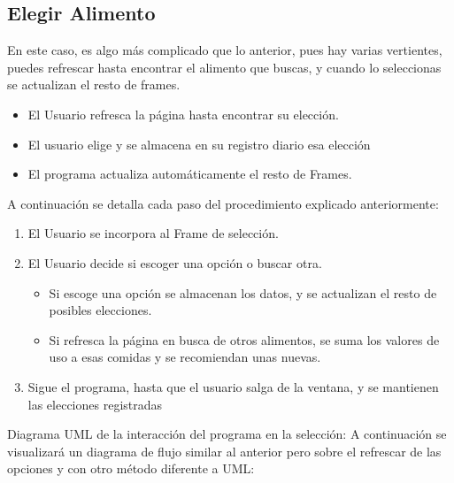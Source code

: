 \subsection{Elegir Alimento}
En este caso, es algo más complicado que lo anterior, pues hay varias vertientes, puedes refrescar hasta encontrar el alimento que buscas, y cuando lo seleccionas se actualizan el resto de frames.
\begin{itemize}
\item El Usuario refresca la página hasta encontrar su elección. 
\item El usuario elige y se almacena en su registro diario esa elección
\item El programa actualiza automáticamente el resto de Frames.
\end{itemize}
A continuación se detalla cada paso del procedimiento explicado anteriormente:
\begin{enumerate}
\item El Usuario se incorpora al Frame de selección.
\item El Usuario decide si escoger una opción o buscar otra.
\begin{itemize}
\item Si escoge una opción se almacenan los datos, y se actualizan el resto de posibles elecciones.
\item Si refresca la página en busca de otros alimentos, se suma los valores de uso a esas comidas y se recomiendan unas nuevas.
\end{itemize}
\item Sigue el programa, hasta que el usuario salga de la ventana, y se mantienen las elecciones registradas
\end{enumerate}
Diagrama UML de la interacción del programa en la selección:
A continuación se visualizará un diagrama de flujo  similar al anterior pero sobre el refrescar de las opciones y con otro método diferente a UML:
